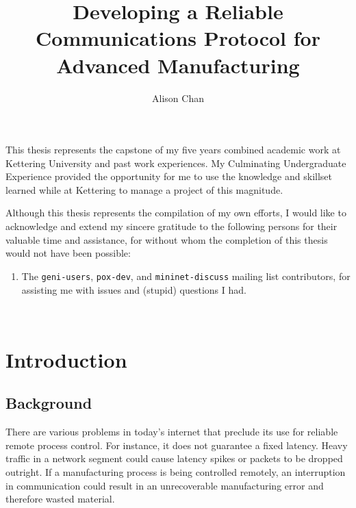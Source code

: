 \documentclass[letterpaper]{../kuthesis/kuthesis}
\title{Developing a Reliable Communications Protocol for Advanced Manufacturing}
\author{Alison Chan}
\begin{document}
\maketitle[research]

\begin{preface}
This thesis represents the capstone of my five years combined academic work 
at Kettering University and past work experiences.  My Culminating 
Undergraduate Experience provided the opportunity for me to use the 
knowledge and skillset learned while at Kettering to manage a project 
of this magnitude.

Although this thesis represents the compilation of my own efforts, I would 
like to acknowledge and extend my sincere gratitude to the following persons 
for their valuable time and assistance, for without whom the completion of 
this thesis would not have been possible:

\begin{enumerate}
  \item The \texttt{geni-users}, \texttt{pox-dev}, and \texttt{mininet-discuss} mailing list
        contributors, for assisting me with issues and (stupid) questions I had.
\end{enumerate}
\end{preface}

\singlespacing
\tableofcontents\
\listofillustrations

\begincontent


\chapter{Introduction}

\section{Background}
There are various problems in today's internet that preclude its use for 
reliable remote process control. For instance, it does not guarantee a 
fixed latency. Heavy traffic in a network segment could cause latency spikes
or packets to be dropped outright. If a manufacturing process is being 
controlled remotely, an interruption in communication could result in an 
unrecoverable manufacturing error and therefore wasted material.
\end{document}
